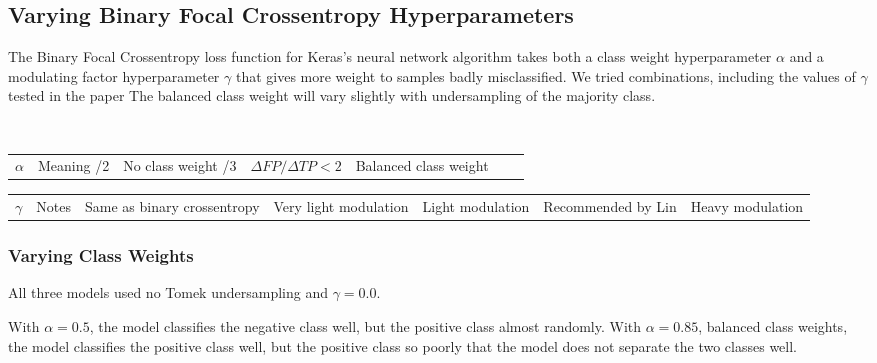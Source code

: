 \subsection{Varying Binary Focal Crossentropy Hyperparameters}

The Binary Focal Crossentropy loss function for Keras's neural network algorithm takes both a class weight hyperparameter $\alpha$ and a modulating factor hyperparameter $\gamma$ that gives more weight to samples badly misclassified.  We tried combinations, including the values of $\gamma$ tested in the paper \cite{lin2017focal}  The balanced class weight will vary slightly with undersampling of the majority class.  

\

\hfil\begin{tabular}{c|c}
	$\alpha$ & Meaning \cr{}/2 & No class weight  /3 & $\Delta FP/\Delta TP < 2$   & Balanced class weight  \cr
	\cr
	\cr
\end{tabular}	
\qquad\begin{tabular}{c|c}
	$\gamma$  & Notes \cr{} & Same as binary crossentropy  & Very light modulation  & Light modulation & Recommended by Lin  & Heavy modulation \cr
\end{tabular}	

\subsubsection{Varying Class Weights}

All three models used no Tomek undersampling and $\gamma=0.0$.

With $\alpha = 0.5$, the model classifies the negative class well, but the positive class almost randomly.  With $\alpha = 0.85$, balanced class weights, the model classifies the positive class well, but the positive class so poorly that the model does not separate the two classes well.  

\

